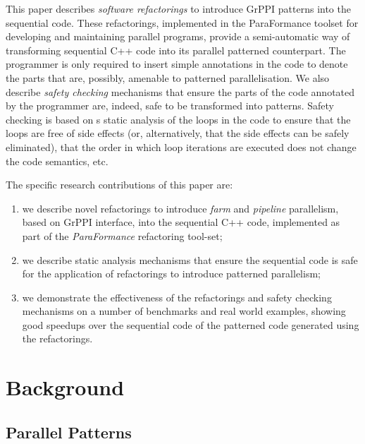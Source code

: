 This paper describes \emph{software refactorings} to introduce GrPPI patterns into the sequential code. These refactorings, implemented in the ParaFormance toolset for developing and maintaining parallel programs, provide a semi-automatic way of transforming sequential C++ code into its parallel patterned counterpart. The programmer is only required to insert simple annotations in the code to denote the parts that are, possibly, amenable to patterned parallelisation. We also describe \emph{safety checking} mechanisms that ensure the parts of the code annotated by the programmer are, indeed, safe to be transformed into patterns. Safety checking is based on s static analysis of the loops in the code to ensure that the loops are free of side effects (or, alternatively, that the side effects can be safely eliminated), that the order in which loop iterations are executed does not change the code semantics, etc. 

The specific research contributions of this paper are:
\begin{enumerate}
    \item we describe novel refactorings to introduce \emph{farm} and \emph{pipeline} parallelism, based on GrPPI interface, into the sequential C++ code, implemented as part of the \emph{ParaFormance} refactoring tool-set;
    \item we describe static analysis mechanisms that ensure the sequential code is safe for the application of refactorings to introduce patterned parallelism;
    \item we demonstrate the effectiveness of the refactorings and safety checking mechanisms on a number of benchmarks and real world examples, showing good speedups over the sequential code of the patterned code generated using the refactorings.
\end{enumerate}




\section{Background}
\label{background}

\subsection{Parallel Patterns}



